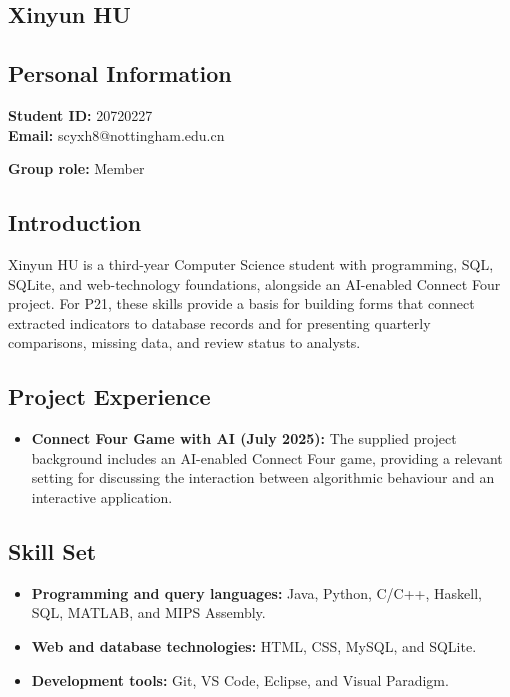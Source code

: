 \documentclass[a4paper,12pt]{article}
\newcommand{\PersonalInformation}[2]{%
  \subsection*{Personal Information}
  \if\relax\detokenize{#1}\relax\else
  \noindent\textbf{Student ID:} #1\\
  \fi
  \textbf{Email:} #2\par
}
\begin{document}
\subsection{Xinyun HU}
\PersonalInformation{20720227}{scyxh8@nottingham.edu.cn}
\noindent\textbf{Group role:} Member\par

\subsection*{Introduction}
Xinyun HU is a third-year Computer Science student with programming, SQL, SQLite, and web-technology foundations, alongside an AI-enabled Connect Four project. For P21, these skills provide a basis for building forms that connect extracted indicators to database records and for presenting quarterly comparisons, missing data, and review status to analysts.

\subsection*{Project Experience}
\begin{itemize}
  \item \textbf{Connect Four Game with AI (July 2025):} The supplied project background includes an AI-enabled Connect Four game, providing a relevant setting for discussing the interaction between algorithmic behaviour and an interactive application.
\end{itemize}

\subsection*{Skill Set}
\begin{itemize}
  \item \textbf{Programming and query languages:} Java, Python, C/C++, Haskell, SQL, MATLAB, and MIPS Assembly.
  \item \textbf{Web and database technologies:} HTML, CSS, MySQL, and SQLite.
  \item \textbf{Development tools:} Git, VS Code, Eclipse, and Visual Paradigm.
\end{itemize}
\end{document}
